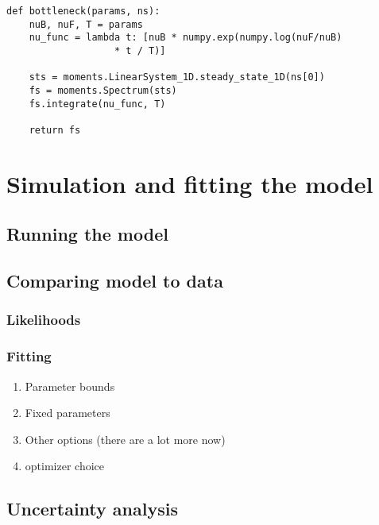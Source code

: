 \documentclass[11pt]{article}
\makeatletter
\newcommand{\py}[1]{\lstinline[breaklines=true,language=Python, showstringspaces=False]@#1@}
\makeatother
\begin{document}
\begin{lstlisting}[caption={\textbf{Bottleneck:} At time \py{TF} + \py{TB} in the past, an equilibrium population goes through a bottleneck of depth \py{nuB}, recovering to relative size \py{nuF}.}, float, label={lst:bottleneck}]
def bottleneck(params, ns):
    nuB, nuF, T = params
    nu_func = lambda t: [nuB * numpy.exp(numpy.log(nuF/nuB) 
    			   * t / T)]

    sts = moments.LinearSystem_1D.steady_state_1D(ns[0])
    fs = moments.Spectrum(sts)
    fs.integrate(nu_func, T)

    return fs
\end{lstlisting}

\clearpage

\section{Simulation and fitting the model}

\subsection{Running the model}

\subsection{Comparing model to data}

\subsubsection{Likelihoods}


\subsubsection{Fitting}

\begin{enumerate}
\item Parameter bounds
\item Fixed parameters
\item Other options (there are a lot more now)
\item optimizer choice
\end{enumerate}

\subsection{Uncertainty analysis}
\end{document}
